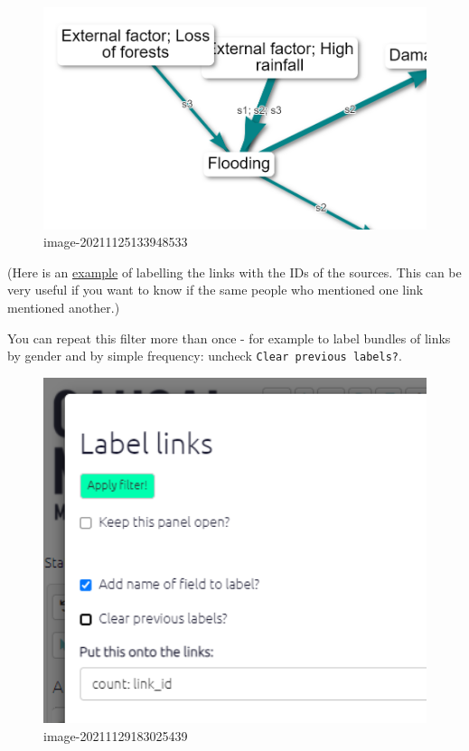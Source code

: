 \documentclass[
]{book}
\begin{document}
\begin{figure}
\centering
\includegraphics[width=6.77083in,height=\textheight]{_assets/image-20211125133948533.png}
\caption{image-20211125133948533}
\end{figure}

(Here is an \href{causalmap.shinyapps.io/CausalMap2/?s=165}{example} of labelling the links with the IDs of the sources. This can be very useful if you want to know if the same people who mentioned one link mentioned another.)

You can repeat this filter more than once - for example to label bundles of links by gender and by simple frequency: uncheck \texttt{Clear\ previous\ labels?}.

\begin{figure}
\centering
\includegraphics[width=6.77083in,height=\textheight]{_assets/image-20211129183025439.png}
\caption{image-20211129183025439}
\end{figure}
\end{document}
